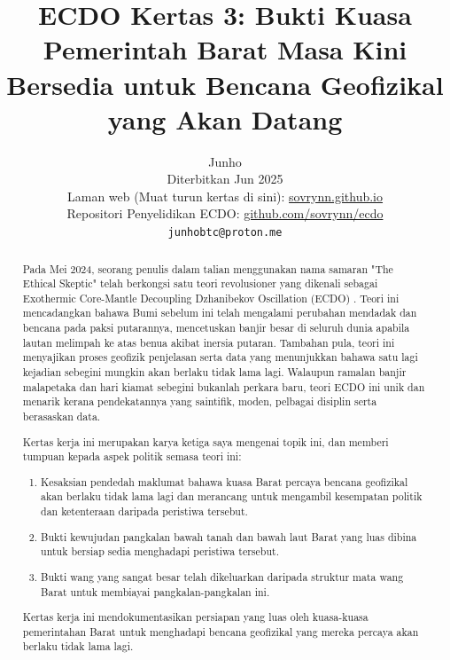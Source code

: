 \documentclass[10pt,twocolumn,letterpaper]{article}
\begin{document}
\title{ECDO Kertas 3: Bukti Kuasa Pemerintah Barat Masa Kini Bersedia untuk Bencana Geofizikal yang Akan Datang}

\author{Junho\\
Diterbitkan Jun 2025\\
Laman web (Muat turun kertas di sini): \href{https://sovrynn.github.io}{sovrynn.github.io}\\
Repositori Penyelidikan ECDO: \href{https://github.com/sovrynn/ecdo}{github.com/sovrynn/ecdo}\\
{\tt\small junhobtc@proton.me}
}
\maketitle

\begin{abstract}
Pada Mei 2024, seorang penulis dalam talian menggunakan nama samaran "The Ethical Skeptic" \cite{0} telah berkongsi satu teori revolusioner yang dikenali sebagai Exothermic Core-Mantle Decoupling Dzhanibekov Oscillation (ECDO) \cite{1}. Teori ini mencadangkan bahawa Bumi sebelum ini telah mengalami perubahan mendadak dan bencana pada paksi putarannya, mencetuskan banjir besar di seluruh dunia apabila lautan melimpah ke atas benua akibat inersia putaran. Tambahan pula, teori ini menyajikan proses geofizik penjelasan serta data yang menunjukkan bahawa satu lagi kejadian sebegini mungkin akan berlaku tidak lama lagi. Walaupun ramalan banjir malapetaka dan hari kiamat sebegini bukanlah perkara baru, teori ECDO ini unik dan menarik kerana pendekatannya yang saintifik, moden, pelbagai disiplin serta berasaskan data.

Kertas kerja ini merupakan karya ketiga saya \cite{2,3} mengenai topik ini, dan memberi tumpuan kepada aspek politik semasa teori ini:
\begin{flushleft}
\begin{enumerate}
    \item Kesaksian pendedah maklumat bahawa kuasa Barat percaya bencana geofizikal akan berlaku tidak lama lagi dan merancang untuk mengambil kesempatan politik dan ketenteraan daripada peristiwa tersebut.
    \item Bukti kewujudan pangkalan bawah tanah dan bawah laut Barat yang luas dibina untuk bersiap sedia menghadapi peristiwa tersebut.
    \item Bukti wang yang sangat besar telah dikeluarkan daripada struktur mata wang Barat untuk membiayai pangkalan-pangkalan ini.
\end{enumerate}
\end{flushleft}
Kertas kerja ini mendokumentasikan persiapan yang luas oleh kuasa-kuasa pemerintahan Barat untuk menghadapi bencana geofizikal yang mereka percaya akan berlaku tidak lama lagi.
\end{abstract}
\end{document}
